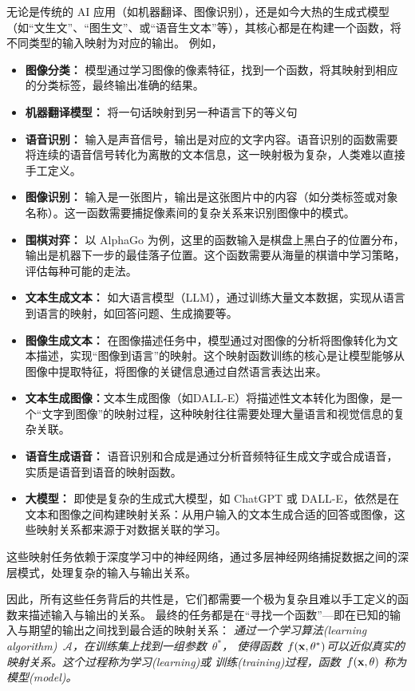 无论是传统的 AI 应用（如机器翻译、图像识别），还是如今大热的生成式模型（如“文生文”、“图生文”、或“语音生文本”等），其核心都是在构建一个函数，将不同类型的输入映射为对应的输出。
例如，
\begin{itemize}
\item {\bf 图像分类：} 模型通过学习图像的像素特征，找到一个函数，将其映射到相应的分类标签，最终输出准确的结果。 
\item {\bf 机器翻译模型：} 将一句话映射到另一种语言下的等义句
\item {\bf 语音识别：} 输入是声音信号，输出是对应的文字内容。语音识别的函数需要将连续的语音信号转化为离散的文本信息，这一映射极为复杂，人类难以直接手工定义。
\item {\bf  图像识别：} 输入是一张图片，输出是这张图片中的内容（如分类标签或对象名称）。这一函数需要捕捉像素间的复杂关系来识别图像中的模式。
\item {\bf 围棋对弈：} 以 AlphaGo 为例，这里的函数输入是棋盘上黑白子的位置分布，输出是机器下一步的最佳落子位置。这个函数需要从海量的棋谱中学习策略，评估每种可能的走法。
\item {\bf 文本生成文本：} 如大语言模型（LLM），通过训练大量文本数据，实现从语言到语言的映射，如回答问题、生成摘要等。 
\item {\bf 图像生成文本：} 在图像描述任务中，模型通过对图像的分析将图像转化为文本描述，实现“图像到语言”的映射。这个映射函数训练的核心是让模型能够从图像中提取特征，将图像的关键信息通过自然语言表达出来。
\item {\bf 文本生成图像：}文本生成图像（如DALL-E）将描述性文本转化为图像，是一个“文字到图像”的映射过程，这种映射往往需要处理大量语言和视觉信息的复杂关联。
\item {\bf 语音生成语音：} 语音识别和合成是通过分析音频特征生成文字或合成语音，实质是语音到语音的映射函数。
\item {\bf 大模型：} 即使是复杂的生成式大模型，如 ChatGPT 或 DALL-E，依然是在文本和图像之间构建映射关系：从用户输入的文本生成合适的回答或图像，这些映射关系都来源于对数据关联的学习。
\end{itemize}
这些映射任务依赖于深度学习中的神经网络，通过多层神经网络捕捉数据之间的深层模式，处理复杂的输入与输出关系。

因此，所有这些任务背后的共性是，它们都需要一个极为复杂且难以手工定义的函数来描述输入与输出的关系。
最终的任务都是在“寻找一个函数”---即在已知的输入与期望的输出之间找到最合适的映射关系：
{\em 通过一个学习算法(learning algorithm)~$\mathcal{A}$，在训练集上找到一组参数~$\theta^\ast$， 使得函数~$f({\bf x}, \theta^\ast)$可以近似真实的映射关系。这个过程称为学习(learning)或 训练(training)过程，函数~$f({\bf x}, \theta)$ 称为模型(model)。}

